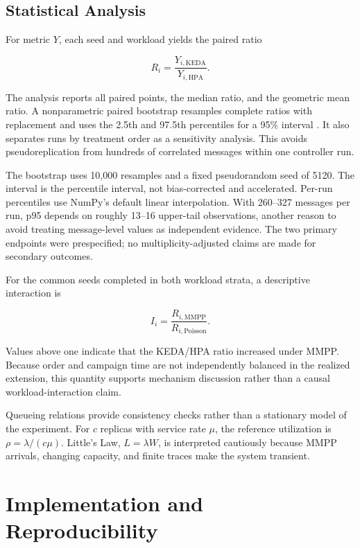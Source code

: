 \documentclass[conference]{IEEEtran}
\begin{document}
\subsection{Statistical Analysis}

For metric $Y$, each seed and workload yields the paired ratio

\begin{equation}
  R_i=\frac{Y_{i,\mathrm{KEDA}}}{Y_{i,\mathrm{HPA}}}.
\end{equation}

The analysis reports all paired points, the median ratio, and the geometric mean
ratio. A nonparametric paired bootstrap resamples complete ratios with replacement
and uses the 2.5th and 97.5th percentiles for a 95\% interval
\cite{Efron1993Bootstrap}. It also separates runs by treatment order as a
sensitivity analysis. This avoids pseudoreplication from hundreds of correlated
messages within one controller run.

The bootstrap uses 10,000 resamples and a fixed pseudorandom seed of 5120. The
interval is the percentile interval, not bias-corrected and accelerated. Per-run
percentiles use NumPy's default linear interpolation. With 260--327 messages per
run, p95 depends on roughly 13--16 upper-tail observations, another reason to
avoid treating message-level values as independent evidence. The two primary
endpoints were prespecified; no multiplicity-adjusted claims are made for
secondary outcomes.

For the common seeds completed in both workload strata, a descriptive
interaction is

\begin{equation}
  I_i=\frac{R_{i,\mathrm{MMPP}}}{R_{i,\mathrm{Poisson}}}.
\end{equation}

Values above one indicate that the KEDA/HPA ratio increased under MMPP. Because
order and campaign time are not independently balanced in the realized
extension, this quantity supports mechanism discussion rather than a causal
workload-interaction claim.

Queueing relations provide consistency checks rather than a stationary model of
the experiment. For $c$ replicas with service rate $\mu$, the reference
utilization is $\rho=\lambda/(c\mu)$. Little's Law, $L=\lambda W$, is interpreted
cautiously because MMPP arrivals, changing capacity, and finite traces make the
system transient.

\section{Implementation and Reproducibility}
\end{document}
